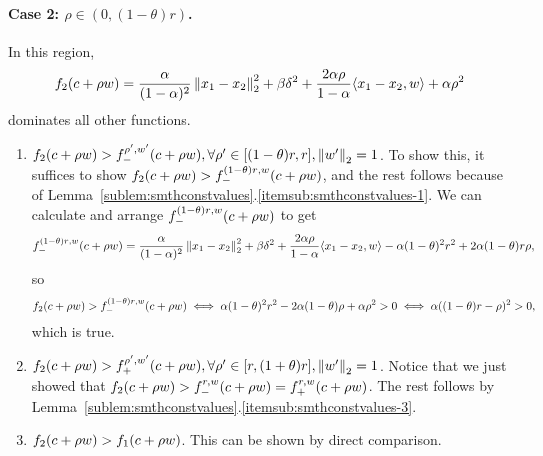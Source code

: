 \paragraph{Case 2: $\rho \in (0, (1-\theta)r)$.}
In this region, 
\begin{equation*}
	f_{2}(c+\rho w) 
	= \frac{\alpha}{(1-\alpha)^2} \left\|{x_1-x_2}\right\|_2^2 
	+ \beta \delta^2
	+ \frac{2\alpha \rho}{1-\alpha} \langle x_1-x_2, w \rangle 
	+ \alpha \rho^2
\end{equation*}
dominates all other functions.
\begin{enumerate}
	\item $f_{2}(c+\rho w) > f_-^{{\rho'},{w'}}(c+\rho w), \forall \rho' \in [(1-\theta)r,r], \left\|{w'}\right\|_2 = 1$.
	To show this, it suffices to show $f_{2}(c+\rho w) > f_-^{{(1-\theta)r},{w}}(c+\rho w)$,
	and the rest follows because of Lemma~\ref{sublem:smthconstvalues}.\ref{itemsub:smthconstvalues-1}.
	We can calculate and arrange $f_-^{{(1-\theta)r},{w}}(c+\rho w)$ to get
	\begin{equation*}
		f_-^{{(1-\theta)r},{w}}(c+\rho w) 
		= \frac{\alpha}{(1-\alpha)^2} \left\|{x_1-x_2}\right\|_2^2 
		+ \beta \delta^2
		+ \frac{2\alpha \rho}{1-\alpha} \langle x_1-x_2, w \rangle 
		- \alpha(1-\theta)^2 r^2 + 2\alpha(1-\theta)r \rho,
	\end{equation*}
	so 
	\begin{equation*}
		f_{2}(c+\rho w) > f_-^{{(1-\theta)r},{w}}(c+\rho w)
		\iff \alpha (1-\theta)^2 r^2 - 2\alpha (1-\theta) \rho + \alpha \rho^2 > 0
		\iff \alpha((1-\theta)r-\rho)^2 > 0,
	\end{equation*}
	which is true.
	\item $f_{2}(c+\rho w) > f_+^{{\rho'},{w'}}(c+\rho w), \forall \rho' \in [r,(1+\theta)r], \left\|{w'}\right\|_2 = 1$.
	Notice that we just showed that 
	$f_{2}(c+\rho w) > f_-^{{r},{w}}(c+\rho w) = f_+^{{r},{w}}(c+\rho w)$.
	The rest follows by Lemma~\ref{sublem:smthconstvalues}.\ref{itemsub:smthconstvalues-3}.
	\item $f_{2}(c+\rho w) > f_{1}(c+\rho w)$. This can be shown by direct comparison.
\end{enumerate}

